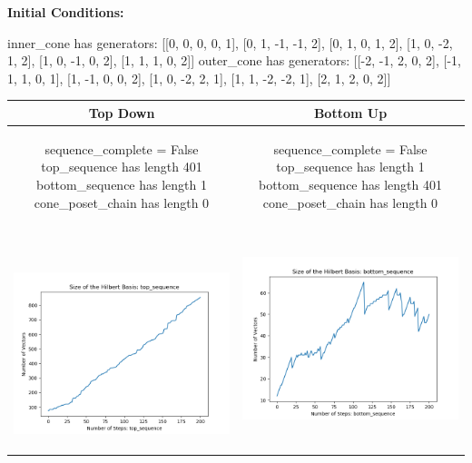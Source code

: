 \documentclass[10pt]{article}
\begin{document}
\textbf{Initial Conditions:}
\begin{SAGE}
inner_cone has generators: 
[[0, 0, 0, 0, 1], [0, 1, -1, -1, 2], [0, 1, 0, 1, 2], [1, 0, -2, 1, 2], [1, 0, -1, 0, 2], [1, 1, 1, 0, 2]]
outer_cone has generators: 
[[-2, -1, 2, 0, 2], [-1, 1, 1, 0, 1], [1, -1, 0, 0, 2], [1, 0, -2, 2, 1], [1, 1, -2, -2, 1], [2, 1, 2, 0, 2]]

\end{SAGE}
\begin{tabular}{c|c}
\textbf{Top Down} & \textbf{Bottom Up} \\ \hline  
\begin{SAGE}
	sequence_complete = False
	top_sequence has length 401
	bottom_sequence has length 1
	cone_poset_chain has length 0
\end{SAGE} 
&
\begin{SAGE}
	sequence_complete = False
	top_sequence has length 1
	bottom_sequence has length 401
	cone_poset_chain has length 0
\end{SAGE} 
\\ \hline
\
\begin{minipage}{.45\textwidth}
\includegraphics[width=\textwidth]{"DATA/5d/6 generators 2 bound F/top_sequence SIZE"}
\end{minipage} &
\begin{minipage}{.45\textwidth}
\includegraphics[width=\textwidth]{"DATA/5d/6 generators 2 bound F bottomup/bottom_sequence SIZE"}

\end{minipage}
\end{tabular}
\end{document}
